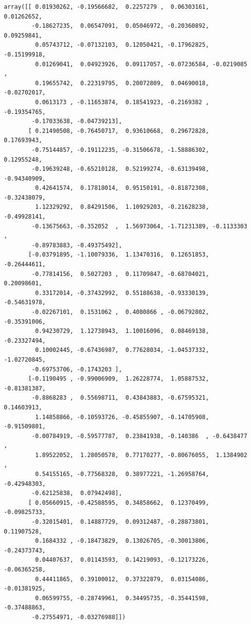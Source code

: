 \documentclass[11pt]{article}
\begin{document}
            \begin{tcolorbox}[breakable, size=fbox, boxrule=1pt, pad at break*=1mm,colback=cellbackground, colframe=cellborder]
\begin{Verbatim}[commandchars=\\\{\}]
array([[ 0.01930262, -0.19566682,  0.2257279 ,  0.06303161,  0.01262652,
        -0.18627235,  0.06547091,  0.05046972, -0.20360892,  0.09259841,
         0.05743712, -0.07132103,  0.12050421, -0.17962825, -0.15199918,
         0.01269041,  0.04923926,  0.09117057, -0.07236584, -0.0219085 ,
         0.19655742,  0.22319795,  0.20072809,  0.04690018, -0.02702017,
         0.0613173 , -0.11653874,  0.18541923, -0.2169382 , -0.19354765,
        -0.17033638, -0.04739213],
       [ 0.21490508, -0.76450717,  0.93610668,  0.29672828,  0.17693943,
        -0.75144857, -0.19112235, -0.31506678, -1.58886302,  0.12955248,
        -0.19639248, -0.65210128,  0.52199274, -0.63139498, -0.94340909,
         0.42641574,  0.17818014,  0.95150191, -0.81872308, -0.32438079,
         1.12329292,  0.84291506,  1.10929203, -0.21628238, -0.49928141,
        -0.13675663, -0.352052  ,  1.56973064, -1.71231389, -0.1133303 ,
        -0.89783883, -0.49375492],
       [-0.03791895, -1.10079336,  1.13470316,  0.12651853, -0.26444611,
        -0.77814156,  0.5027203 ,  0.11709847, -0.68704021,  0.20098601,
         0.33172014, -0.37432992,  0.55188638, -0.93330139, -0.54631978,
        -0.02267101,  0.1531062 ,  0.4080866 , -0.06792802, -0.35391006,
         0.94230729,  1.12738943,  1.10016096,  0.08469138, -0.23327494,
         0.10002445, -0.67436987,  0.77628034, -1.04537332, -1.02720845,
        -0.69753706, -0.1743203 ],
       [-0.1190495 , -0.99006909,  1.26228774,  1.05887532, -0.81381387,
        -0.8868283 ,  0.55698711,  0.43843883, -0.67595321,  0.14603913,
         1.14858866, -0.10593726, -0.45855907, -0.14705908, -0.91509801,
        -0.00784919, -0.59577787,  0.23841938, -0.140386  , -0.6438477 ,
         1.89522052,  1.28050578,  0.77170277, -0.80676055,  1.1384902 ,
         0.54155165, -0.77568328,  0.38977221, -1.26958764, -0.42948303,
        -0.62125838,  0.07942498],
       [ 0.05660915, -0.42588595,  0.34858662,  0.12370499, -0.09825733,
        -0.32015401,  0.14887729,  0.09312487, -0.28873801,  0.11907528,
         0.1684332 , -0.18473829,  0.13026705, -0.30013806, -0.24373743,
         0.04407637,  0.01143593,  0.14219093, -0.12173226, -0.06365258,
         0.44411865,  0.39100012,  0.37322879,  0.03154086, -0.01381925,
         0.06599755, -0.28749961,  0.34495735, -0.35441598, -0.37488863,
        -0.27554971, -0.03276988]])
\end{Verbatim}
\end{tcolorbox}
        
\end{document}
